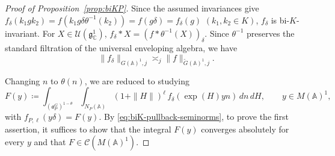 \documentclass[12pt]{amsart}
\theoremstyle{definition}
\theoremstyle{plain}
\theoremstyle{remark}
\def\C{\mathbb{C}}%
\def\A{\mathbb{A}}%
\newcommand{\fa}{\mathfrak{a}}
\newcommand{\fg}{\mathfrak{g}}
\newcommand{\cC}{\mathcal{C}}
\newcommand{\cU}{\mathcal{U}}
\numberwithin{equation}{section}
\begin{document}
\begin{proof}[Proof of Proposition~\ref{prop:biKP}]
Since the assumed invariances give $f_\delta(k_1gk_2)=f(k_1g\delta\theta^{-1}(k_2))=f(g\delta)=f_\delta(g)$ $(k_1,k_2\in K)$, $f_\delta$ is bi-$K$-invariant.
For $X\in\cU(\fg_\C^1)$, $f_\delta*X=(f*\theta^{-1}(X))_\delta$. 
Since \(\theta^{-1}\) preserves the standard filtration
of the universal enveloping algebra, we have
\begin{equation}\label{eq:biK-pullback-seminorms}
\| f_\delta \|_{G(\A)^1,j}\asymp_j\|f\|_{\widetilde G(\A)^1,j}.
\end{equation}

Changing $n$ to $\theta(n)$,
we are reduced to studying
\begin{equation*}
F(y)\coloneqq
\int_{(\fa_P^G)^{1-\theta}}\int_{N_P(\A)}
(1+\|H\|)^\ell \, f_\delta(\exp(H)yn)\,dn\,dH,
\qquad y\in M(\A)^1,
\end{equation*}
with $f_{P,\ell}(y\delta)=F(y)$.
By \eqref{eq:biK-pullback-seminorms}, to prove the first assertion, it suffices to show that the integral $F(y)$ converges absolutely for every $y$ and that $F\in\cC(M(\A)^1)$.


\end{proof}
\end{document}
